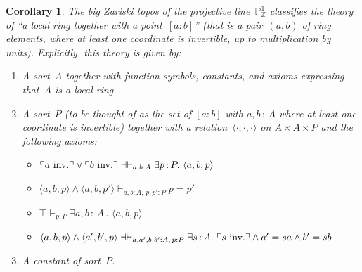 \documentclass[10pt,reqno,a4paper]{amsbook}
\makeatletter
\theoremstyle{definition}
\theoremstyle{plain}
\newtheorem{cor}[defn]{Corollary}
\theoremstyle{remark}
\newcommand{\ZZ}{\mathbb{Z}}
\newcommand{\PP}{\mathbb{P}}
\newcommand{\?}{\,{:}\,}
\newcommand{\hg}{\mathbin{:}}  %
\renewcommand{\_}{\mathpunct{.}\,}
\newcommand{\speak}[1]{\ulcorner\text{\textnormal{#1}}\urcorner}
\newcommand{\inv}{inv.\@}
\makeatother
\begin{document}
\begin{cor}\label{cor:pp1-classifies}
The big Zariski topos of the projective line~$\PP^1_\ZZ$ classifies the theory of ``a local
ring together with a point~$[a \hg b]$'' (that is a pair~$(a,b)$ of ring elements,
where at least one coordinate is invertible, up to multiplication by units).
Explicitly, this theory is given by:
\begin{enumerate}
\item A sort~$A$ together with function symbols, constants, and axioms expressing
that~$A$ is a local ring.
\item A sort~$P$ (to be thought of as the set of $[a \hg b]$ with $a,b\?A$ where at
least one coordinate is invertible) together with a
relation~$\langle\cdot,\cdot,\cdot\rangle$ on $A \times A \times P$ and the
following axioms:
\begin{itemize}
\item $\speak{$a$ \inv} \vee \speak{$b$ \inv}
\dashv\vdash_{a,b{:}A} \exists p\?P\_ \langle a,b,p \rangle$
\item $\langle a,b,p \rangle \wedge \langle a,b,p' \rangle
\vdash_{a,b{:}A,\,p,p'{:}P} p = p'$
\item $\top \vdash_{p{:}P} \exists a,b\?A\_ \langle a,b,p \rangle$
\item $\langle a,b,p \rangle \wedge \langle a',b',p \rangle
\dashv\vdash_{a,a',b,b'{:}A,\, p{:}P} \exists s\?A\_ \speak{$s$ \inv} \wedge a' = s a \wedge b' = s b$
\end{itemize}
\item A constant of sort~$P$.
\end{enumerate}
\end{cor}
\end{document}
